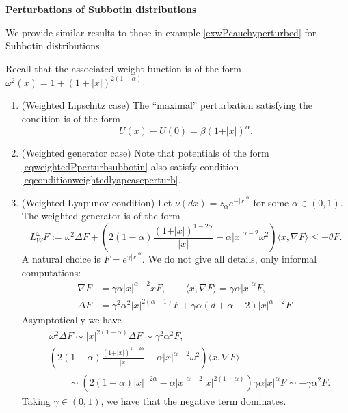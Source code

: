 \documentclass[11pt,reqno]{amsart}
\numberwithin{equation}{section}
\theoremstyle{definition}
\theoremstyle{remark}
\begin{document}
\noindent \textbf{Perturbations of Subbotin distributions}
\medskip

We provide similar results to those in example \ref{exwPcauchyperturbed} for  Subbotin distributions.

Recall that the associated weight function is of the form $\omega^2(x) = 1+(1+|x|)^{2(1-\alpha)}$.
\begin{enumerate}
    \item[(a)] (Weighted Lipschitz case) The ``maximal'' perturbation satisfying the condition is of the form
    \begin{equation}\label{eqweightedPperturbsubbotin}
        U(x)-U(0) = \beta (1+\vert x\vert)^\alpha.
    \end{equation}
    \item[(b)] (Weighted generator case) Note that  potentials of the form \eqref{eqweightedPperturbsubbotin} also satisfy condition \eqref{eqconditionweightedlyapcaseperturb}.
    \item[(c)] (Weighted Lyapunov condition) Let $\nu(dx) = z_\alpha e^{-\vert x\vert^\alpha}$ for some $\alpha\in(0,1)$. The weighted generator is of the form
    \begin{equation*}
        L_W^\omega F := \omega^2 \Delta F +\left(2(1-\alpha) \frac{(1+\vert x\vert)^{1-2\alpha}}{\vert x\vert}       -\alpha\vert x\vert^{\alpha-2}\omega^2\right)\langle x, \nabla F \rangle\leq -\theta F.
    \end{equation*}
A natural choice is $F=e^{\gamma\vert x\vert^\alpha}$. We do not give all details, only informal computations:
    \begin{align*}
        \nabla F &= \gamma\alpha\vert x\vert^{\alpha-2} x F, \quad\quad \langle x, \nabla F \rangle=\gamma\alpha \vert x\vert^\alpha F, \\
        \Delta F &= \gamma^2\alpha^2\vert x\vert^{2(\alpha-1)}  F+\gamma\alpha(d+\alpha-2)\vert x\vert^{\alpha-2}F.
    \end{align*}
    Asymptotically we have
    \begin{align*}
        &\omega^2 \Delta F \sim \vert x\vert^{2(1-\alpha)}\Delta F \sim \gamma^2\alpha^2 F,\\
       &\left(2(1-\alpha) \frac{(1+\vert x\vert)^{1-2\alpha}}{\vert x\vert}       -\alpha\vert x\vert^{\alpha-2}\omega^2\right)\langle x, \nabla F\rangle\\
       &\quad\quad\sim\left(2(1-\alpha)\vert x\vert^{-2\alpha} -\alpha \vert x\vert^{\alpha-2}\vert x\vert^{2(1-\alpha)}\right) \gamma \alpha \vert x\vert^\alpha F\sim -\gamma\alpha^2 F.
    \end{align*}
Taking $\gamma\in(0,1)$, we have that the negative term dominates.


\end{enumerate}
\end{document}
